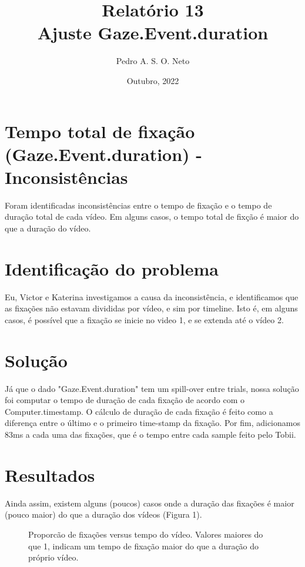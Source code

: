 \documentclass{article}
\title{Relatório 13 \\ Ajuste Gaze.Event.duration}
\author{Pedro A. S. O. Neto}
\date{Outubro, 2022}
\begin{document}
\maketitle

\section{Tempo total de fixação (Gaze.Event.duration) - Inconsistências}

Foram identificadas inconsistências entre o tempo de fixação e o tempo de duração total de cada vídeo. Em alguns casos, o tempo total de fixção é maior do que a duração do vídeo.

\section{Identificação do problema}

Eu, Victor e Katerina investigamos a causa da inconsistência, e identificamos que as fixações não estavam divididas por vídeo, e sim por timeline. Isto é, em alguns casos, é possível que a fixação se inicie no video 1, e se extenda até o vídeo 2.

\section{Solução}

Já que o dado "Gaze.Event.duration" tem um spill-over entre trials, nossa solução foi computar o tempo de duração de cada fixação de acordo com o Computer.timestamp. O cálculo de duração de cada fixação é feito como a diferença entre o último e o primeiro time-stamp da fixação. Por fim, adicionamos 83ms a cada uma das fixações, que é o tempo entre cada sample feito pelo Tobii.

\section{Resultados}

Ainda assim, existem alguns (poucos) casos onde a duração das fixações é maior (pouco maior) do que a duração dos vídeos (Figura 1).

\begin{figure}[]
  \caption{Proporcão de fixações versus tempo do vídeo. Valores maiores do que 1, indicam um tempo de fixação maior do que a duração do próprio vídeo.}
  \noindent{}
  \centering
\end{figure}
\end{document}

